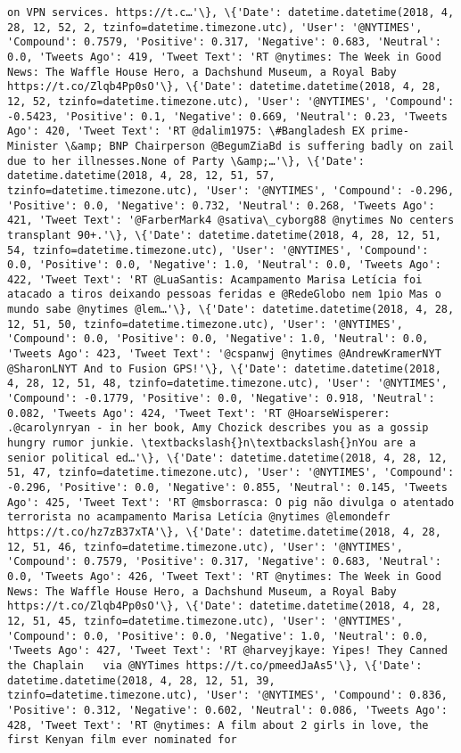 \documentclass[11pt]{article}
\begin{document}
\begin{Verbatim}[commandchars=\\\{\}]
on VPN services. https://t.c…'\}, \{'Date': datetime.datetime(2018, 4, 28, 12, 52, 2, tzinfo=datetime.timezone.utc), 'User': '@NYTIMES', 'Compound': 0.7579, 'Positive': 0.317, 'Negative': 0.683, 'Neutral': 0.0, 'Tweets Ago': 419, 'Tweet Text': 'RT @nytimes: The Week in Good News: The Waffle House Hero, a Dachshund Museum, a Royal Baby https://t.co/Zlqb4Pp0sO'\}, \{'Date': datetime.datetime(2018, 4, 28, 12, 52, tzinfo=datetime.timezone.utc), 'User': '@NYTIMES', 'Compound': -0.5423, 'Positive': 0.1, 'Negative': 0.669, 'Neutral': 0.23, 'Tweets Ago': 420, 'Tweet Text': 'RT @dalim1975: \#Bangladesh EX prime-Minister \&amp; BNP Chairperson @BegumZiaBd is suffering badly on zail due to her illnesses.None of Party \&amp;…'\}, \{'Date': datetime.datetime(2018, 4, 28, 12, 51, 57, tzinfo=datetime.timezone.utc), 'User': '@NYTIMES', 'Compound': -0.296, 'Positive': 0.0, 'Negative': 0.732, 'Neutral': 0.268, 'Tweets Ago': 421, 'Tweet Text': '@FarberMark4 @sativa\_cyborg88 @nytimes No centers transplant 90+.'\}, \{'Date': datetime.datetime(2018, 4, 28, 12, 51, 54, tzinfo=datetime.timezone.utc), 'User': '@NYTIMES', 'Compound': 0.0, 'Positive': 0.0, 'Negative': 1.0, 'Neutral': 0.0, 'Tweets Ago': 422, 'Tweet Text': 'RT @LuaSantis: Acampamento Marisa Letícia foi atacado a tiros deixando pessoas feridas e @RedeGlobo nem 1pio Mas o mundo sabe @nytimes @lem…'\}, \{'Date': datetime.datetime(2018, 4, 28, 12, 51, 50, tzinfo=datetime.timezone.utc), 'User': '@NYTIMES', 'Compound': 0.0, 'Positive': 0.0, 'Negative': 1.0, 'Neutral': 0.0, 'Tweets Ago': 423, 'Tweet Text': '@cspanwj @nytimes @AndrewKramerNYT @SharonLNYT And to Fusion GPS!'\}, \{'Date': datetime.datetime(2018, 4, 28, 12, 51, 48, tzinfo=datetime.timezone.utc), 'User': '@NYTIMES', 'Compound': -0.1779, 'Positive': 0.0, 'Negative': 0.918, 'Neutral': 0.082, 'Tweets Ago': 424, 'Tweet Text': 'RT @HoarseWisperer: .@carolynryan - in her book, Amy Chozick describes you as a gossip hungry rumor junkie. \textbackslash{}n\textbackslash{}nYou are a senior political ed…'\}, \{'Date': datetime.datetime(2018, 4, 28, 12, 51, 47, tzinfo=datetime.timezone.utc), 'User': '@NYTIMES', 'Compound': -0.296, 'Positive': 0.0, 'Negative': 0.855, 'Neutral': 0.145, 'Tweets Ago': 425, 'Tweet Text': 'RT @msborrasca: O pig não divulga o atentado terrorista no acampamento Marisa Letícia @nytimes @lemondefr https://t.co/hz7zB37xTA'\}, \{'Date': datetime.datetime(2018, 4, 28, 12, 51, 46, tzinfo=datetime.timezone.utc), 'User': '@NYTIMES', 'Compound': 0.7579, 'Positive': 0.317, 'Negative': 0.683, 'Neutral': 0.0, 'Tweets Ago': 426, 'Tweet Text': 'RT @nytimes: The Week in Good News: The Waffle House Hero, a Dachshund Museum, a Royal Baby https://t.co/Zlqb4Pp0sO'\}, \{'Date': datetime.datetime(2018, 4, 28, 12, 51, 45, tzinfo=datetime.timezone.utc), 'User': '@NYTIMES', 'Compound': 0.0, 'Positive': 0.0, 'Negative': 1.0, 'Neutral': 0.0, 'Tweets Ago': 427, 'Tweet Text': 'RT @harveyjkaye: Yipes! They Canned the Chaplain   via @NYTimes https://t.co/pmeedJaAs5'\}, \{'Date': datetime.datetime(2018, 4, 28, 12, 51, 39, tzinfo=datetime.timezone.utc), 'User': '@NYTIMES', 'Compound': 0.836, 'Positive': 0.312, 'Negative': 0.602, 'Neutral': 0.086, 'Tweets Ago': 428, 'Tweet Text': 'RT @nytimes: A film about 2 girls in love, the first Kenyan film ever nominated for 
\end{Verbatim}
\end{document}
